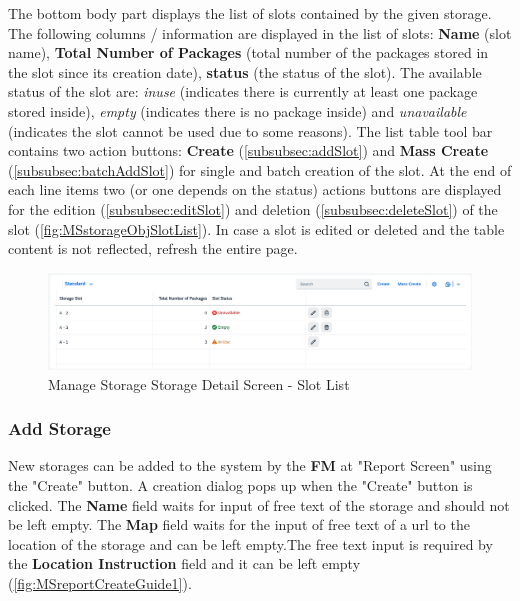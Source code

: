 The bottom body part displays the list of slots contained by the given storage. 
The following columns / information are displayed in the list of slots: \textbf{Name} (slot name), \textbf{Total Number of Packages} (total number of the packages stored in the slot since its creation date), \textbf{status} (the status of the slot). The available status of the slot are: \textit{inuse} (indicates there is currently at least one package stored inside), \textit{empty} (indicates there is no package inside) and \textit{unavailable} (indicates the slot cannot be used due to some reasons).
The list table tool bar contains two action buttons: \textbf{Create} (\autoref{subsubsec:addSlot}) and \textbf{Mass Create} (\autoref{subsubsec:batchAddSlot}) for single and batch creation of the slot. 
At the end of each line items two (or one depends on the status) actions buttons are displayed for the edition (\autoref{subsubsec:editSlot}) and deletion (\autoref{subsubsec:deleteSlot}) of the slot (\autoref{fig:MSstorageObjSlotList}).
In case a slot is edited or deleted and the table content is not reflected, refresh the entire page.

\begin{figure}[H] %
	\centering
	\includegraphics[width=1\linewidth]{images/user_doc/storage/updatedSlotEditDelete/StorageObjectSlotTable.png}
	\caption{Manage Storage Storage Detail Screen - Slot List}
	\label{fig:MSstorageObjSlotList}
\end{figure}

\bigskip

\subsubsection{Add Storage}

New storages can be added to the system by the \textbf{FM} at "Report Screen" using the "Create" button.
A creation dialog pops up when the "Create" button is clicked. The \textbf{Name} field waits for input of free text of the storage and should not be left empty. The \textbf{Map} field waits for the input of free text of a url to the location of the storage and can be left empty.The free text input is required by the \textbf{Location Instruction} field and it can be left empty (\autoref{fig:MSreportCreateGuide1}).

